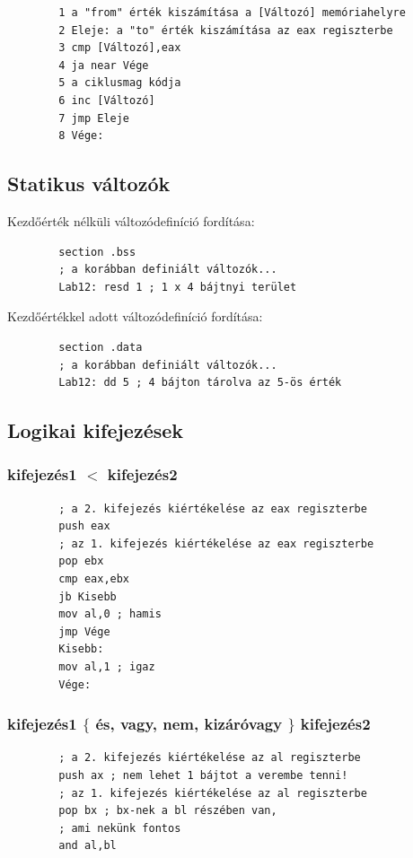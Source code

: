 \documentclass[margin=0px]{article}
\begin{document}
	
	\begin{verbatim}
		1 a "from" érték kiszámítása a [Változó] memóriahelyre
		2 Eleje: a "to" érték kiszámítása az eax regiszterbe
		3 cmp [Változó],eax
		4 ja near Vége
		5 a ciklusmag kódja
		6 inc [Változó]
		7 jmp Eleje
		8 Vége:
	\end{verbatim}

\subsection{Statikus változók}
	
	Kezdőérték nélküli változódefiníció fordítása:
	\begin{verbatim}
		section .bss
		; a korábban definiált változók...
		Lab12: resd 1 ; 1 x 4 bájtnyi terület
	\end{verbatim}

	
	Kezdőértékkel adott változódefiníció fordítása:
	\begin{verbatim}
		section .data
		; a korábban definiált változók...
		Lab12: dd 5 ; 4 bájton tárolva az 5-ös érték
	\end{verbatim}

\subsection{Logikai kifejezések}

\subsubsection{kifejezés1 $ < $  kifejezés2 }
	
	\begin{verbatim}
		; a 2. kifejezés kiértékelése az eax regiszterbe
		push eax
		; az 1. kifejezés kiértékelése az eax regiszterbe
		pop ebx
		cmp eax,ebx
		jb Kisebb
		mov al,0 ; hamis
		jmp Vége
		Kisebb:
		mov al,1 ; igaz
		Vége:
	\end{verbatim}

\subsubsection{kifejezés1 $ \lbrace $ és, vagy, nem, kizáróvagy  $ \rbrace $  kifejezés2 }

	\begin{verbatim}
		; a 2. kifejezés kiértékelése az al regiszterbe
		push ax ; nem lehet 1 bájtot a verembe tenni!
		; az 1. kifejezés kiértékelése az al regiszterbe
		pop bx ; bx-nek a bl részében van,
		; ami nekünk fontos
		and al,bl
	\end{verbatim}
	
\end{document}
